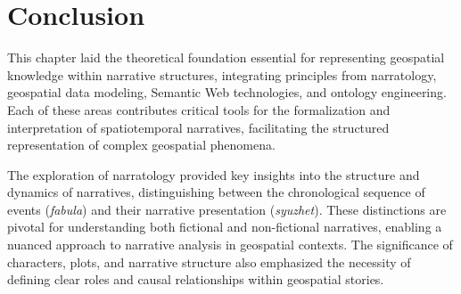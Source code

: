 


\section{Conclusion}\label{II-sec:conclusion}

This chapter laid the theoretical foundation essential for representing geospatial knowledge within narrative structures, integrating principles from narratology, geospatial data modeling, Semantic Web technologies, and ontology engineering. Each of these areas contributes critical tools for the formalization and interpretation of spatiotemporal narratives, facilitating the structured representation of complex geospatial phenomena.

The exploration of narratology provided key insights into the structure and dynamics of narratives, distinguishing between the chronological sequence of events (\textit{fabula}) and their narrative presentation (\textit{syuzhet}). These distinctions are pivotal for understanding both fictional and non-fictional narratives, enabling a nuanced approach to narrative analysis in geospatial contexts. The significance of characters, plots, and narrative structure also emphasized the necessity of defining clear roles and causal relationships within geospatial stories.

